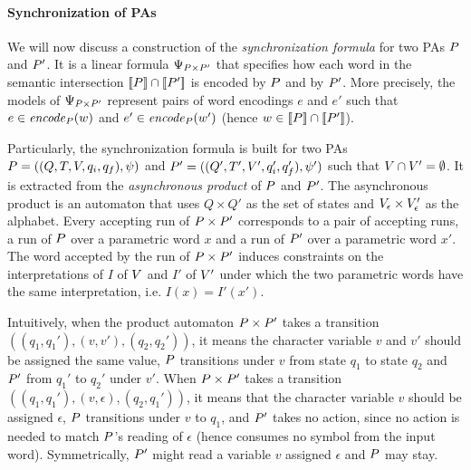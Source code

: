 \documentclass[sigplan,review,anonymous]{acmart}\settopmatter{printfolios=true,printccs=false,printacmref=false}
\begin{document}
\paragraph{Synchronization of PAs}
We will now discuss a construction of the \emph{synchronization formula} for two PAs $P$ and $P'$. 
It is a linear formula $\Psi_{P \times P'}$ 
that specifies how each word in the semantic intersection $[\![P]\!] \cap [\![P']\!]$ is encoded by $P$ and by $P'$.
%
More precisely, the models of $\Psi_{P \times P'}$ represent pairs of word
encodings 
$e$ and $e'$ such that $e\in\mathit{encode}_{P}(w)$ and $e'\in\mathit{encode}_{P}(w')$ (hence $w\in[\![P]\!]\cap[\![P']\!]$).

Particularly, the synchronization formula is built for two PAs  
$P = ((Q,T,V,q_i,q_f),\psi)$ and ${P'} = ((Q',T',V',q_i',q_f'),\psi')$ such that $V \cap V' = \emptyset$. 
%
It is extracted from the \emph{asynchronous product} of $P$ and $P'$. 
%
The asynchronous product is an automaton that uses $Q\times Q'$ as the set of states and 
$V_\epsilon\times V'_\epsilon$
as the alphabet. 
%
Every accepting run of $P \times P'$ corresponds to a pair of accepting runs, 
a run of $P$ over a parametric word $x$ and a run of ${P'}$ over a parametric word $x'$. 
The word accepted by the run of $P \times P'$ induces constraints on the interpretations of $I$ of $V$ and $I'$ of $V'$ under which the two parametric words have the same interpretation, i.e. $I(x) = I'(x')$. 

Intuitively, when the product automaton $P \times P'$ takes a transition $((q_1,q_1'), (v,v'),(q_2,q_2'))$, 
it means the character variable $v$ and $v'$ should be assigned the same value,
$P$ transitions under $v$ from state $q_1$ to state $q_2$ and ${P'}$ from $q_1'$ to $q_2'$ under $v'$.
%
When $P \times P'$ takes a transition $((q_1,q_1'), (v,\epsilon),(q_2,q_1'))$, 
it means that the character variable $v$ should be assigned $\epsilon$, 
$P$ transitions under $v$ to $q_1$, and ${P'}$ takes no action, since no action is needed to match $P$'s reading of $\epsilon$ (hence consumes no symbol from the input word). Symmetrically, ${P'}$ might read a variable $v$ assigned $\epsilon$ and $P$ may stay.
\end{document}
